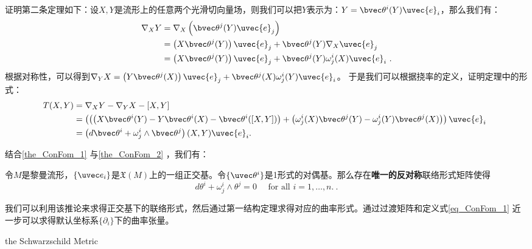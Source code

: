 证明第二条定理如下：设$X,Y$是流形上的任意两个光滑切向量场，则我们可以把$Y$表示为：$Y=\bvec \theta^i(Y)\uvec{e}_i$，那么我们有：
\begin{equation}
\begin{aligned}
\nabla_{X} Y & =\nabla_{X}\left(\bvec\theta^{j}(Y) \uvec{e}_{j}\right) \\
& =\left(X \bvec\theta^{j}(Y)\right) \uvec{e}_{j}+\bvec\theta^{j}(Y) \nabla_{X} \uvec{e}_{j} \\
& =\left(X \bvec \theta^{j}(Y)\right) \uvec{e}_{j}+\bvec\theta^{j}(Y) \omega_{j}^{i}(X) \uvec{e}_{i}~.
\end{aligned}
\end{equation}
根据对称性，可以得到$\nabla_{Y} X =\left(Y \bvec \theta^{j}(X)\right) \uvec{e}_{j}+\bvec\theta^{j}(X) \omega_{j}^{i}(Y) \uvec{e}_{i}$。
于是我们可以根据挠率的定义，证明定理中的形式：
\begin{equation}
\begin{aligned}
T(X, Y) & =\nabla_{X} Y-\nabla_{Y} X-[X, Y] \\
& =\left(\left(\left(X \bvec\theta^{i}(Y)-Y \bvec\theta^{i}(X)-\bvec\theta^{i}([X, Y])\right)+\left(\omega_{j}^{i}(X) \bvec\theta^{j}(Y)-\omega_{j}^{i}(Y) \bvec\theta^{j}(X)\right)\right) \uvec{e}_{i}\right. \\
& =\left(d \bvec \theta^{i}+\omega_{j}^{i} \wedge \bvec \theta^{j}\right)(X, Y) \uvec{e}_{i}.
\end{aligned}~
\end{equation}


结合\autoref{the_ConFom_1} 与\autoref{the_ConFom_2} ，我们有：

\begin{corollary}{}
令$M$是黎曼流形，$\{\uvec e_i\}$是$\mathfrak{X}(M)$上的一组正交基。令$\{\uvec\theta^i\}$是1形式的对偶基。那么存在\textbf{唯一的}\textbf{反对称}联络形式矩阵使得
\begin{equation}
d \theta^{i}+\omega_{j}^{i} \wedge \theta^{j}=0 \quad \text { for all } i=1, \ldots, n .~.
\end{equation}
\end{corollary}
\texb

我们可以利用该推论来求得正交基下的联络形式，然后通过第一结构定理求得对应的曲率形式。通过过渡矩阵和定义式\autoref{eq_ConFom_1} 近一步可以求得默认坐标系$\{\partial_i\}$下的曲率张量。
\begin{example}{the Schwarzschild Metric}

\end{example}




